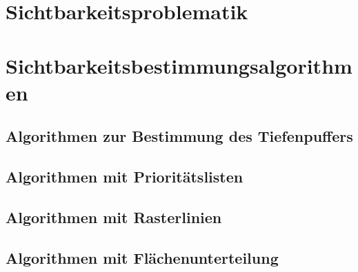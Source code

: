 \section{Sichtbarkeitsproblematik}
\section{Sichtbarkeitsbestimmungsalgorithmen}
\subsection{Algorithmen zur Bestimmung des Tiefenpuffers}
\subsection{Algorithmen mit Prioritätslisten}
\subsection{Algorithmen mit Rasterlinien}
\subsection{Algorithmen mit Flächenunterteilung}

